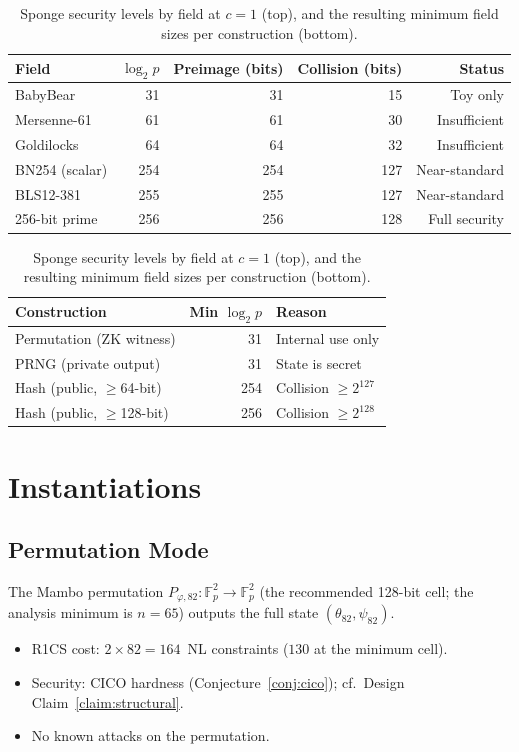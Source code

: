 \documentclass[11pt,a4paper]{article}
\theoremstyle{definition}
\newcommand{\Fp}{\mathbb{F}_p}
\begin{document}
\begin{table}[h]
\centering
\caption{Sponge security levels by field at $c=1$ (top), and the
resulting minimum field sizes per construction (bottom).}
\label{tab:sponge_sec}
\begin{tabular}{@{}lrrrr@{}}
\toprule
Field & $\log_2 p$ & Preimage (bits) & Collision (bits) & Status \\
\midrule
BabyBear      &  31 &  31 & 15 & Toy only \\
Mersenne-61   &  61 &  61 & 30 & Insufficient \\
Goldilocks    &  64 &  64 & 32 & Insufficient \\
BN254 (scalar)& 254 & 254 & 127 & Near-standard \\
BLS12-381     & 255 & 255 & 127 & Near-standard \\
256-bit prime & 256 & 256 & 128 & Full security \\
\bottomrule
\end{tabular}

\medskip

\begin{tabular}{@{}lrl@{}}
\toprule
Construction & Min $\log_2 p$ & Reason \\
\midrule
Permutation (ZK witness) & 31  & Internal use only \\
PRNG (private output)    & 31  & State is secret \\
Hash (public, $\ge$64-bit) & 254 & Collision $\ge 2^{127}$ \\
Hash (public, $\ge$128-bit) & 256 & Collision $\ge 2^{128}$ \\
\bottomrule
\end{tabular}
\end{table}

\section{Instantiations}\label{sec:instantiations}

\subsection{Permutation Mode}\label{sec:inst:perm}

The Mambo permutation $P_{\varphi,82}\colon \Fp^2 \to \Fp^2$ (the
recommended 128-bit cell; the analysis minimum is $n = 65$) outputs
the full state $(\theta_{82}, \psi_{82})$.
\begin{itemize}[nosep]
  \item R1CS cost: $2 \times 82 = 164$~NL constraints ($130$ at the
        minimum cell).
  \item Security: CICO hardness (Conjecture~\ref{conj:cico});
        cf.\ Design Claim~\ref{claim:structural}.
  \item No known attacks on the permutation.
\end{itemize}
\end{document}
